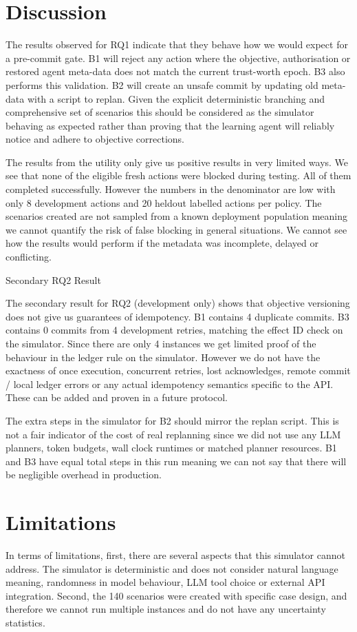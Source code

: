 \documentclass[conference]{IEEEtran}
\begin{document}
\section{Discussion}
The results observed for RQ1 indicate that they behave how we would expect for a pre-commit gate. B1 will reject any action where the objective, authorisation or restored agent meta-data does not match the current trust-worth epoch. B3 also performs this validation. B2 will create an unsafe commit by updating old meta-data with a script to replan. Given the explicit deterministic branching and comprehensive set of scenarios this should be considered as the simulator behaving as expected rather than proving that the learning agent will reliably notice and adhere to objective corrections.

The results from the utility only give us positive results in very limited ways. We see that none of the eligible fresh actions were blocked during testing. All of them completed successfully. However the numbers in the denominator are low with only 8 development actions and 20 heldout labelled actions per policy. The scenarios created are not sampled from a known deployment population meaning we cannot quantify the risk of false blocking in general situations. We cannot see how the results would perform if the metadata was incomplete, delayed or conflicting.

Secondary RQ2 Result

The secondary result for RQ2 (development only) shows that objective versioning does not give us guarantees of idempotency. B1 contains 4 duplicate commits. B3 contains 0 commits from 4 development retries, matching the effect ID check on the simulator. Since there are only 4 instances we get limited proof of the behaviour in the ledger rule on the simulator. However we do not have the exactness of once execution, concurrent retries, lost acknowledges, remote commit / local ledger errors or any actual idempotency semantics specific to the API. These can be added and proven in a future protocol.

The extra steps in the simulator for B2 should mirror the replan script. This is not a fair indicator of the cost of real replanning since we did not use any LLM planners, token budgets, wall clock runtimes or matched planner resources. B1 and B3 have equal total steps in this run meaning we can not say that there will be negligible overhead in production.

\section{Limitations}\label{sec:limitations}
In terms of limitations, first, there are several aspects that this simulator cannot address. The simulator is deterministic and does not consider natural language meaning, randomness in model behaviour, LLM tool choice or external API integration. Second, the 140 scenarios were created with specific case design, and therefore we cannot run multiple instances and do not have any uncertainty statistics.
\end{document}

